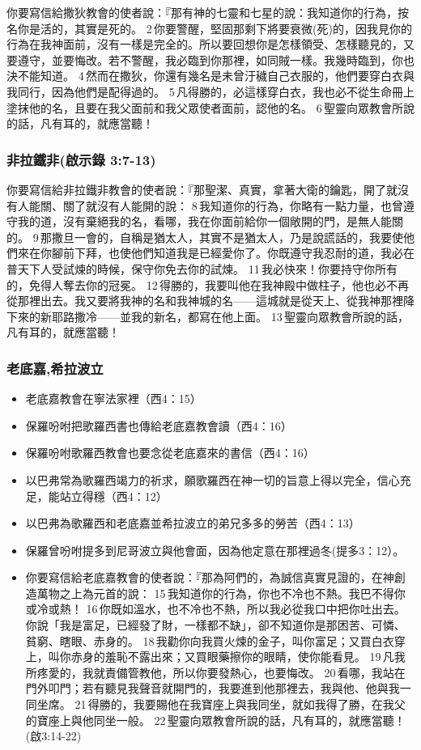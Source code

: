 你要寫信給撒狄教會的使者說：『那有神的七靈和七星的說：我知道你的行為，按名你是活的，其實是死的。 2 你要警醒，堅固那剩下將要衰微(死)的，因我見你的行為在我神面前，沒有一樣是完全的。所以要回想你是怎樣領受、怎樣聽見的，又要遵守，並要悔改。若不警醒，我必臨到你那裡，如同賊一樣。我幾時臨到，你也決不能知道。 4 然而在撒狄，你還有幾名是未曾汙穢自己衣服的，他們要穿白衣與我同行，因為他們是配得過的。 5 凡得勝的，必這樣穿白衣，我也必不從生命冊上塗抹他的名，且要在我父面前和我父眾使者面前，認他的名。 6 聖靈向眾教會所說的話，凡有耳的，就應當聽！

\subsubsection{非拉鐵非(啟示錄 3:7-13)}
你要寫信給非拉鐵非教會的使者說：『那聖潔、真實，拿著大衛的鑰匙，開了就沒有人能關、關了就沒有人能開的說： 8 我知道你的行為，你略有一點力量，也曾遵守我的道，沒有棄絕我的名，看哪，我在你面前給你一個敞開的門，是無人能關的。 9 那撒旦一會的，自稱是猶太人，其實不是猶太人，乃是說謊話的，我要使他們來在你腳前下拜，也使他們知道我是已經愛你了。你既遵守我忍耐的道，我必在普天下人受試煉的時候，保守你免去你的試煉。 11 我必快來！你要持守你所有的，免得人奪去你的冠冕。 12 得勝的，我要叫他在我神殿中做柱子，他也必不再從那裡出去。我又要將我神的名和我神城的名——這城就是從天上、從我神那裡降下來的新耶路撒冷——並我的新名，都寫在他上面。 13 聖靈向眾教會所說的話，凡有耳的，就應當聽！

\subsubsection{老底嘉,希拉波立}
\begin{itemize}%
\itemsep-.15em 
\item 老底嘉教會在寧法家裡（西4：15）
\item 保羅吩咐把歌羅西書也傳給老底嘉教會讀（西4：16）
\item 保羅吩咐歌羅西教會也要念從老底嘉來的書信（西4：16）
\item 以巴弗常為歌羅西竭力的祈求，願歌羅西在神一切的旨意上得以完全，信心充足，能站立得穩（西4：12）
\item 以巴弗為歌羅西和老底嘉並希拉波立的弟兄多多的勞苦（西4：13）
\item 保羅曾吩咐提多到尼哥波立與他會面，因為他定意在那裡過冬(提多3：12）。 
\item 你要寫信給老底嘉教會的使者說：『那為阿們的，為誠信真實見證的，在神創造萬物之上為元首的說： 15 我知道你的行為，你也不冷也不熱。我巴不得你或冷或熱！ 16 你既如溫水，也不冷也不熱，所以我必從我口中把你吐出去。你說「我是富足，已經發了財，一樣都不缺」，卻不知道你是那困苦、可憐、貧窮、瞎眼、赤身的。 18 我勸你向我買火煉的金子，叫你富足；又買白衣穿上，叫你赤身的羞恥不露出來；又買眼藥擦你的眼睛，使你能看見。 19 凡我所疼愛的，我就責備管教他，所以你要發熱心，也要悔改。 20 看哪，我站在門外叩門；若有聽見我聲音就開門的，我要進到他那裡去，我與他、他與我一同坐席。 21 得勝的，我要賜他在我寶座上與我同坐，就如我得了勝，在我父的寶座上與他同坐一般。 22 聖靈向眾教會所說的話，凡有耳的，就應當聽！(啟3:14-22)
\end{itemize}



